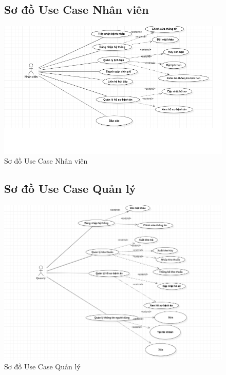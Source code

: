 \documentclass{report}
\begin{document}
\pagebreak
\begin{center}
	\begin{figure}[!htp]
		\subsection{Sơ đồ Use Case Nhân viên}
		\begin{center}
			\includegraphics[scale=.6]{Hinh/Sơ đồ Use Case Nhân viên.png}
		\end{center}
		\caption{Sơ đồ Use Case Nhân viên}
	\end{figure}
\end{center}

\begin{center}
	\begin{figure}[!htp]
		\subsection{Sơ đồ Use Case Quản lý}
		\begin{center}
			\includegraphics[scale=.5]{Hinh/Sơ đồ Use Case Quản lý.png}
		\end{center}
		\caption{Sơ đồ Use Case Quản lý}
	\end{figure}
\end{center}
\end{document}
